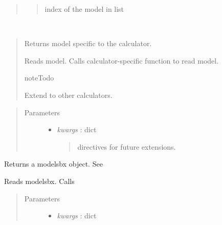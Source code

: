 \documentclass[letterpaper,10pt,english]{sphinxmanual}
\begin{document}
\begin{fulllineitems}
\begin{fulllineitems}
\begin{quote}
\begin{description}
\begin{itemize}
\begin{quote}
index of the model in list
\end{quote}

\end{itemize}

\end{description}\end{quote}

\end{fulllineitems}


\begin{fulllineitems}
\label{classes:catparam.CATParam.read_model}~\begin{quote}

Returns model specific to the calculator.

Reads model. Calls calculator-specific function to read model.

\begin{notice}{note}{Todo}

Extend to other calculators.
\end{notice}
\end{quote}
\begin{quote}\begin{description}
\item[{Parameters}] \leavevmode\begin{itemize}
\item {} 
\emph{kwargs} : dict
\begin{quote}

directives for future extensions.
\end{quote}

\end{itemize}

\end{description}\end{quote}

\end{fulllineitems}


\begin{fulllineitems}
\label{classes:catparam.CATParam.read_modelsbx}
Returns a modelsbx object. See {\hyperref[classes:bopmodel.modelsbx]{}}

Reads modelsbx. Calls 
\begin{quote}\begin{description}
\item[{Parameters}] \leavevmode\begin{itemize}
\item {} 
\emph{kwargs} : dict
\begin{quote}


\end{quote}
\end{itemize}
\end{description}
\end{quote}
\end{fulllineitems}
\end{fulllineitems}
\end{document}
